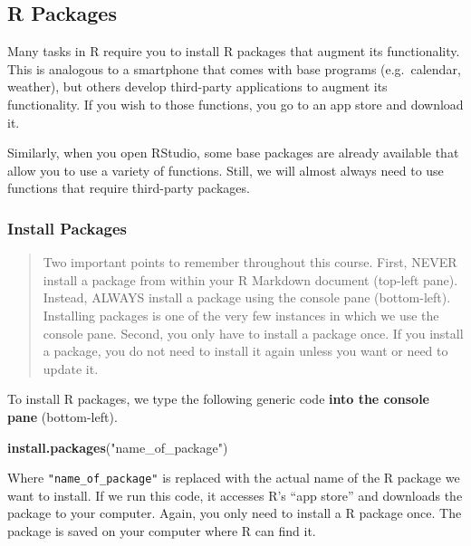 \documentclass[
]{book}
\makeatletter
\newenvironment{Shaded}{\begin{snugshade}}{\end{snugshade}}
\newcommand{\FunctionTok}[1]{\textcolor[rgb]{0.27,0.27,0.27}{\textbf{#1}}}
\newcommand{\NormalTok}[1]{#1}
\newcommand{\StringTok}[1]{\textcolor[rgb]{0.5,0.5,0.5}{#1}}
\newenvironment{kframe}{%
\medskip{}
\setlength{\fboxsep}{.8em}
 \def\at@end@of@kframe{}%
 \ifinner\ifhmode%
  \def\at@end@of@kframe{\end{minipage}}%
  \begin{minipage}{\columnwidth}%
 \fi\fi%
 \def\FrameCommand##1{\hskip\@totalleftmargin \hskip-\fboxsep
 \colorbox{shadecolor}{##1}\hskip-\fboxsep
     \hskip-\linewidth \hskip-\@totalleftmargin \hskip\columnwidth}%
 \MakeFramed {\advance\hsize-\width
   \@totalleftmargin\z@ \linewidth\hsize
   \@setminipage}}%
 {\par\unskip\endMakeFramed%
 \at@end@of@kframe}
\renewenvironment{Shaded}{\begin{kframe}}{\end{kframe}}
\makeatother
\begin{document}
\hypertarget{r-packages}{%
\subsection{R Packages}\label{r-packages}}

Many tasks in R require you to install R packages that augment its functionality. This is analogous to a smartphone that comes with base programs (e.g.~calendar, weather), but others develop third-party applications to augment its functionality. If you wish to those functions, you go to an app store and download it.

Similarly, when you open RStudio, some base packages are already available that allow you to use a variety of functions. Still, we will almost always need to use functions that require third-party packages.

\hypertarget{install-packages}{%
\subsubsection*{Install Packages}\label{install-packages}}


\begin{quote}
Two important points to remember throughout this course. First, NEVER install a package from within your R Markdown document (top-left pane). Instead, ALWAYS install a package using the console pane (bottom-left). Installing packages is one of the very few instances in which we use the console pane. Second, you only have to install a package once. If you install a package, you do not need to install it again unless you want or need to update it.
\end{quote}

To install R packages, we type the following generic code \textbf{into the console pane} (bottom-left).

\begin{Shaded}
\begin{Highlighting}[]
\FunctionTok{install.packages}\NormalTok{(}\StringTok{"name\_of\_package"}\NormalTok{)}
\end{Highlighting}
\end{Shaded}

Where \texttt{"name\_of\_package"} is replaced with the actual name of the R package we want to install. If we run this code, it accesses R's ``app store'' and downloads the package to your computer. Again, you only need to install a R package once. The package is saved on your computer where R can find it.
\end{document}
